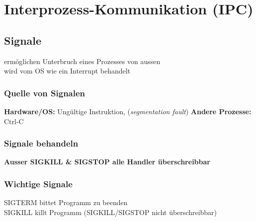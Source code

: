 \section{Interprozess-Kommunikation (IPC)}
\subsection{Signale}
ermöglichen Unterbruch eines Prozesses von aussen\\
wird vom OS wie ein Interrupt behandelt

\subsubsection{Quelle von Signalen}
\textbf{Hardware/OS: }Ungültige Instruktion, (\textit{segmentation fault})
\textbf{Andere Prozesse: }Ctrl-C

\subsubsection{Signale behandeln}
\textbf{Ausser SIGKILL \& SIGSTOP alle Handler überschreibbar}

\subsubsection{Wichtige Signale}
SIGTERM bittet Programm zu beenden \\
SIGKILL killt Programm (SIGKILL/SIGSTOP nicht überschreibbar)


